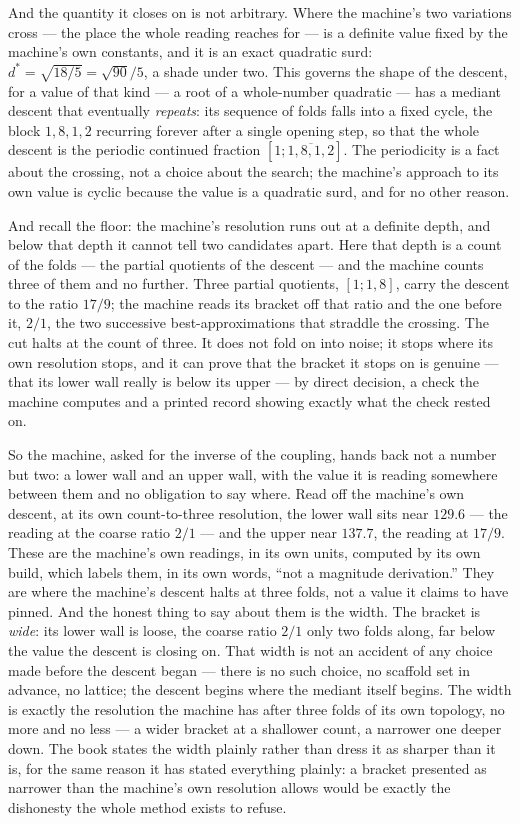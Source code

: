 And the quantity it closes on is not arbitrary. Where the machine's two variations cross --- the place the whole reading
reaches for --- is a definite value fixed by the machine's own constants, and it is an exact quadratic surd:
$d^{*} = \sqrt{18/5} = \sqrt{90}/5$, a shade under two. This governs the shape of the descent, for a value of that
kind --- a root of a whole-number quadratic --- has a mediant descent that eventually \emph{repeats}: its sequence of
folds falls into a fixed cycle, the block $1,8,1,2$ recurring forever after a single opening step, so that the whole
descent is the periodic continued fraction $[1;\overline{1,8,1,2}]$. The periodicity is a fact about the crossing, not a
choice about the search; the machine's approach to its own value is cyclic because the value is a quadratic surd, and
for no other reason.

And recall the floor: the machine's resolution runs out at a definite depth, and below that depth it cannot tell two
candidates apart. Here that depth is a count of the folds --- the partial quotients of the descent --- and the machine
counts three of them and no further. Three partial quotients, $[1;1,8]$, carry the descent to the ratio $17/9$; the
machine reads its bracket off that ratio and the one before it, $2/1$, the two successive best-approximations that
straddle the crossing. The cut halts at the count of three. It does not fold on into noise; it stops where its own
resolution stops, and it can prove that the bracket it stops on is genuine --- that its lower wall really is below its
upper --- by direct decision, a check the machine computes and a printed record showing exactly what the check rested
on.

So the machine, asked for the inverse of the coupling, hands back not a number but two: a lower wall and an upper wall,
with the value it is reading somewhere between them and no obligation to say where. Read off the machine's own descent,
at its own count-to-three resolution, the lower wall sits near $129.6$ --- the reading at the coarse ratio $2/1$ --- and
the upper near $137.7$, the reading at $17/9$. These are the machine's own readings, in its own units, computed by its
own build, which labels them, in its own words, ``not a magnitude derivation.'' They are where the machine's descent
halts at three folds, not a value it claims to have pinned. And the honest thing to say about them is the width. The
bracket is \emph{wide}: its lower wall is loose, the coarse ratio $2/1$ only two folds along, far below the value the
descent is closing on. That width is not an accident of any choice made before the descent began --- there is no such
choice, no scaffold set in advance, no lattice; the descent begins where the mediant itself begins. The width is exactly the resolution the
machine has after three folds of its own topology, no more and no less --- a wider bracket at a shallower count, a
narrower one deeper down. The book states the width plainly rather than dress it as sharper than it is, for the same
reason it has stated everything plainly: a bracket presented as narrower than the machine's own resolution allows would
be exactly the dishonesty the whole method exists to refuse.

